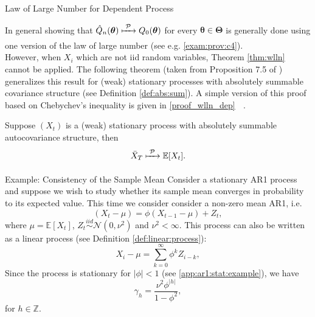 \documentclass[envcountsect,usenames,dvipsnames]{beamer}
\def\btheta{\bm \theta}
\def\bTheta{\bm \Theta}
\def\simiid{\stackrel{iid}{\sim}}
\theoremstyle{mystyle}
\begin{document}
\begin{frame}{Law of Large Number for Dependent Process}

\small
In general showing that $\hat{Q}_n (\btheta) \xmapsto[\;\;\;\;\; ]{\mathcal{P}} Q_0 (\btheta)$ for every $\btheta \in \bTheta$ is generally done using one version of the law of large number (see e.g. \ref{exam:prov:c4}).\\
\vspace{0.5cm}
However, when $X_i$ which are not iid random variables, Theorem \ref{thm:wlln} cannot be applied. The following theorem (taken from Proposition 7.5 of \cite{hamilton1994time}) generalizes this result for (weak) stationary processes with absolutely summable covariance structure (see Definition \ref{def:abs:sum}). A simple version of this proof based on Chebychev's inequality is given in \ref{proof_wlln_dep} $\;$ \hyperlink{proof_wlln_dep}{}.

\begin{Theorem}
\label{thm:wlln:dep}
    Suppose $(X_t)$ is a (weak) stationary process with absolutely summable autocovariance structure, then $$\bar{X}_T \xmapsto[\;\;\;\;\; ]{\mathcal{P}} \mathbb{E}[X_t].$$
\end{Theorem}

\end{frame}



\begin{frame}{Example: Consistency of the Sample Mean}
\small
Consider a stationary AR1 process and suppose we wish to study whether its sample mean converges in probability to its expected value. This time we consider consider a non-zero mean AR1, i.e.
%
\begin{equation*}
    \left(X_t - \mu\right) = \phi \left(X_{t-1} - \mu\right) + Z_t,
\end{equation*}
%
where $\mu = \mathbb{E}[X_t]$, $Z_t \simiid \mathcal{N} (0, \nu^2)$ and $\nu^2 < \infty$. This process can also be written as a linear process (see Definition \ref{def:linear:process}):
%
\begin{equation*}
    X_i - \mu = \sum_{k=0}^{\infty}\phi^k Z_{i-k},
\end{equation*}
%
Since the process is stationary for $|\phi| < 1$ (see \ref{app:ar1:stat:example}), we have
%
\begin{equation*}
    \gamma_h = \frac{\nu^2 \phi^{|h|}}{1-\phi^2},
\end{equation*}
%
for $h \in \mathbb{Z}$.
\end{frame}
\end{document}
